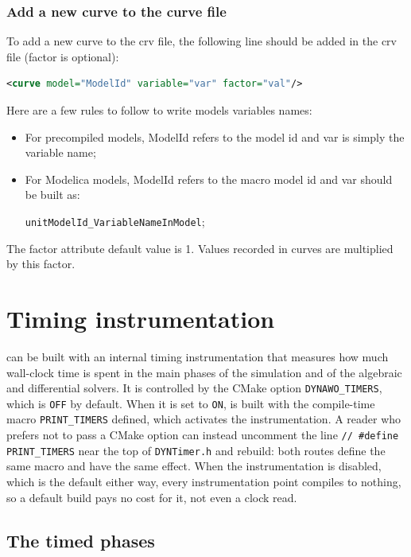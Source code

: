 \documentclass[a4paper, 12pt]{report}
\begin{document}
\subsubsection{Add a new curve to the curve file}

To add a new curve to the crv file, the following line should be added in the crv file (factor is optional):
\begin{lstlisting}[language=XML,numbers=none]
<curve model="ModelId" variable="var" factor="val"/>
\end{lstlisting}

Here are a few rules to follow to write models variables names:
\begin{itemize}
\item For precompiled models, ModelId refers to the model id and var is simply the variable name;
\item For Modelica models, ModelId refers to the macro model id and var should be built as:

\verb|unitModelId_VariableNameInModel|;
\end{itemize}

The factor attribute default value is 1. Values recorded in curves are multiplied by this factor.

\section{Timing instrumentation}

\Dynawo can be built with an internal timing instrumentation that measures how much wall-clock time is spent in the main phases of the simulation and of the algebraic and differential solvers. It is controlled by the CMake option \texttt{DYNAWO\_TIMERS}, which is \texttt{OFF} by default. When it is set to \texttt{ON}, \Dynawo is built with the compile-time macro \texttt{PRINT\_TIMERS} defined, which activates the instrumentation. A reader who prefers not to pass a CMake option can instead uncomment the line \texttt{// \#define PRINT\_TIMERS} near the top of \texttt{DYNTimer.h} and rebuild: both routes define the same macro and have the same effect. When the instrumentation is disabled, which is the default either way, every instrumentation point compiles to nothing, so a default build pays no cost for it, not even a clock read.

\subsection{The timed phases}
\end{document}
